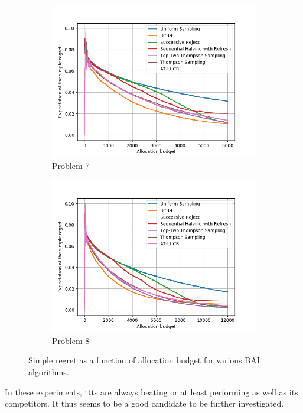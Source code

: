 \begin{figure}[ht]
\begin{subfigure}[t]{0.25\textwidth}
    \centering\includegraphics[width=\textwidth]{Chapter6/img/bai/setting7.png}
    \caption{Problem 7}
  \end{subfigure}
  \begin{subfigure}[t]{0.25\textwidth}
    \centering\includegraphics[width=\textwidth]{Chapter6/img/bai/setting8.png}
    \caption{Problem 8}
  \end{subfigure}
  \caption{Simple regret as a function of allocation budget for various BAI algorithms.}
  \label{fig:bai}
\end{figure}

In these experiments, \gls{ttts} are always beating or at least performing as well as its competitors. It thus seems to be a good candidate to be further investigated.

